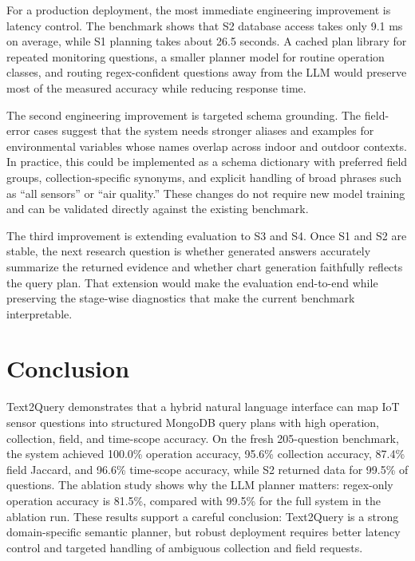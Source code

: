 \documentclass[11pt]{article}
\begin{document}
For a production deployment, the most immediate engineering improvement is latency control. The benchmark shows that S2 database access takes only 9.1 ms on average, while S1 planning takes about 26.5 seconds. A cached plan library for repeated monitoring questions, a smaller planner model for routine operation classes, and routing regex-confident questions away from the LLM would preserve most of the measured accuracy while reducing response time.

The second engineering improvement is targeted schema grounding. The field-error cases suggest that the system needs stronger aliases and examples for environmental variables whose names overlap across indoor and outdoor contexts. In practice, this could be implemented as a schema dictionary with preferred field groups, collection-specific synonyms, and explicit handling of broad phrases such as ``all sensors'' or ``air quality.'' These changes do not require new model training and can be validated directly against the existing benchmark.

The third improvement is extending evaluation to S3 and S4. Once S1 and S2 are stable, the next research question is whether generated answers accurately summarize the returned evidence and whether chart generation faithfully reflects the query plan. That extension would make the evaluation end-to-end while preserving the stage-wise diagnostics that make the current benchmark interpretable.

\section{Conclusion}

Text2Query demonstrates that a hybrid natural language interface can map IoT sensor questions into structured MongoDB query plans with high operation, collection, field, and time-scope accuracy. On the fresh 205-question benchmark, the system achieved 100.0\% operation accuracy, 95.6\% collection accuracy, 87.4\% field Jaccard, and 96.6\% time-scope accuracy, while S2 returned data for 99.5\% of questions. The ablation study shows why the LLM planner matters: regex-only operation accuracy is 81.5\%, compared with 99.5\% for the full system in the ablation run. These results support a careful conclusion: Text2Query is a strong domain-specific semantic planner, but robust deployment requires better latency control and targeted handling of ambiguous collection and field requests.
\end{document}
